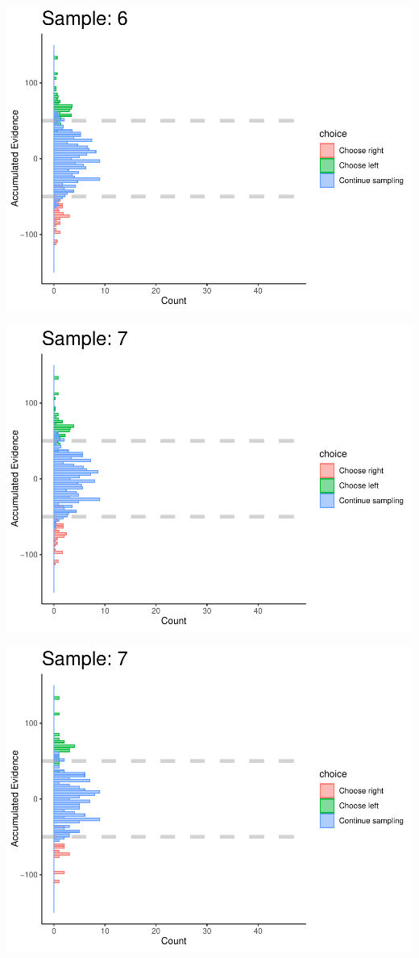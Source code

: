 \documentclass[
]{book}
\begin{document}
\begin{center}\includegraphics[width=0.8\linewidth]{LateNightBayes_files/figure-latex/fixed_check-58} \end{center}

\begin{center}\includegraphics[width=0.8\linewidth]{LateNightBayes_files/figure-latex/fixed_check-59} \end{center}

\begin{center}\includegraphics[width=0.8\linewidth]{LateNightBayes_files/figure-latex/fixed_check-60} \end{center}
\end{document}
